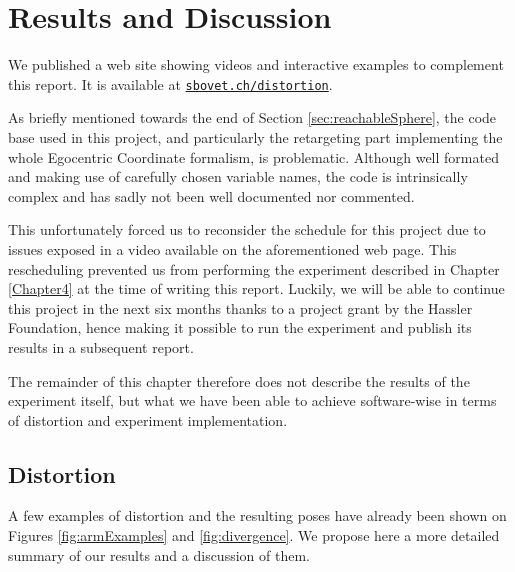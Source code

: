 
\chapter{Results and Discussion}
\label{Chapter5}

We published a web site showing videos and interactive examples to complement this report. It is available at \href{https://sbovet.ch/distortion/}{\texttt{sbovet.ch/distortion}}.

As briefly mentioned towards the end of Section \ref{sec:reachableSphere}, the code base used in this project, and particularly the retargeting part implementing the whole Egocentric Coordinate formalism, is problematic. Although well formated and making use of carefully chosen variable names, the code is intrinsically complex and has sadly not been well documented nor commented.

This unfortunately forced us to reconsider the schedule for this project due to issues exposed in a video available on the aforementioned web page. This rescheduling prevented us from performing the experiment described in Chapter \ref{Chapter4} at the time of writing this report. Luckily, we will be able to continue this project in the next six months thanks to a project grant by the Hassler Foundation, hence making it possible to run the experiment and publish its results in a subsequent report.

The remainder of this chapter therefore does not describe the results of the experiment itself, but what we have been able to achieve software-wise in terms of distortion and experiment implementation.

\section{Distortion}

A few examples of distortion and the resulting poses have already been shown on Figures \ref{fig:armExamples} and \ref{fig:divergence}. We propose here a more detailed summary of our results and a discussion of them.


